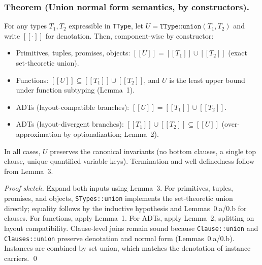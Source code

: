 \documentclass[11pt]{article}
\begin{document}
\subsubsection*{Theorem (Union normal form semantics, by constructors).}
For any types $T_1, T_2$ expressible in \texttt{TType}, let $U = \texttt{TType::union}(T_1, T_2)$ and write $[[\cdot]]$ for denotation. Then, component-wise by constructor:
\begin{itemize}[leftmargin=*]
  \item Primitives, tuples, promises, objects: $[[U]] = [[T_1]] \cup [[T_2]]$ (exact set-theoretic union).
  \item Functions: $[[U]] \subseteq [[T_1]] \cup [[T_2]]$, and $U$ is the least upper bound under function subtyping (Lemma~1).
  \item ADTs (layout-compatible branches): $[[U]] = [[T_1]] \cup [[T_2]]$.
  \item ADTs (layout-divergent branches): $[[T_1]] \cup [[T_2]] \subseteq [[U]]$ (over-approximation by optionalization; Lemma~2).
\end{itemize}
In all cases, $U$ preserves the canonical invariants (no bottom clauses, a single top clause, unique quantified-variable keys). Termination and well-definedness follow from Lemma~3.

\textit{Proof sketch.}
Expand both inputs using Lemma~3. For primitives, tuples, promises, and objects, \texttt{STypes::union} implements the set-theoretic union directly; equality follows by the inductive hypothesis and Lemmas~0.a/0.b for clauses. For functions, apply Lemma~1. For ADTs, apply Lemma~2, splitting on layout compatibility. Clause-level joins remain sound because \texttt{Clause::union} and \texttt{Clauses::union} preserve denotation and normal form (Lemmas~0.a/0.b). Instances are combined by set union, which matches the denotation of instance carriers. \qed
\end{document}
